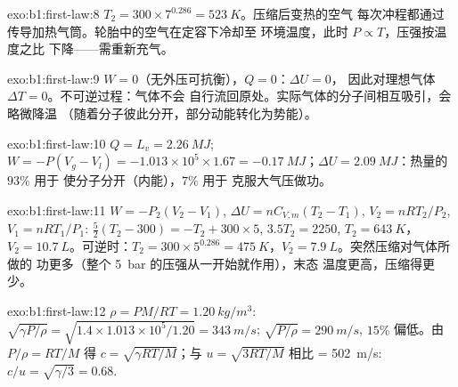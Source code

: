\begin{solution}{exo:b1:first-law:8}
$T_2 = 300 \times 7^{0.286} = \qty{523}{K}$。压缩后变热的空气
每次冲程都通过传导加热气筒。轮胎中的空气在定容下冷却至
环境温度，此时 $P \propto T$，压强按温度之比
下降——需重新充气。
\end{solution}

\begin{solution}{exo:b1:first-law:9}
$W = 0$（无外压可抗衡），$Q = 0$：$\Delta U = 0$，
因此对理想气体 $\Delta T = 0$。不可逆过程：气体不会
自行流回原处。实际气体的分子间相互吸引，会略微降温
（随着分子彼此分开，部分动能转化为势能）。
\end{solution}

\begin{solution}{exo:b1:first-law:10}
$Q = L_v = \qty{2.26}{MJ}$; $W = -P(V_g - V_l) = -1.013\times10^5 \times 1.67 =
\qty{-0.17}{MJ}$；$\Delta U = \qty{2.09}{MJ}$：热量的 $93\%$ 用于
使分子分开（内能），$7\%$ 用于
克服大气压做功。
\end{solution}

\begin{solution}{exo:b1:first-law:11}
$W = -P_2(V_2 - V_1)$, $\Delta U = nC_{V,m}(T_2 - T_1)$, $V_2 = nRT_2/P_2$, $V_1
= nRT_1/P_1$: $\tfrac52(T_2 - 300) = -T_2 + 300 \times 5$, $3.5T_2 = 2250$,
$T_2 = \qty{643}{K}$，$V_2 = \qty{10.7}{L}$。可逆时：$T_2 = 300 \times
5^{0.286} = \qty{475}{K}$，$V_2 = \qty{7.9}{L}$。突然压缩对气体所做的
功更多（整个 \qty{5}{bar} 的压强从一开始就作用），末态
温度更高，压缩得更少。
\end{solution}

\begin{solution}{exo:b1:first-law:12}
$\rho = PM/RT = \qty{1.20}{kg/m^3}$: $\sqrt{\gamma P/\rho} = \sqrt{1.4 \times
1.013\times10^5/1.20} = \qty{343}{m/s}$; $\sqrt{P/\rho} = \qty{290}{m/s}$, $15\%$
偏低。由 $P/\rho = RT/M$ 得 $c = \sqrt{\gamma RT/M}$；与 $u = \sqrt{3RT/M}$ 相比
= \qty{502}{m/s}: $c/u = \sqrt{\gamma/3} = 0.68$.
\end{solution}

